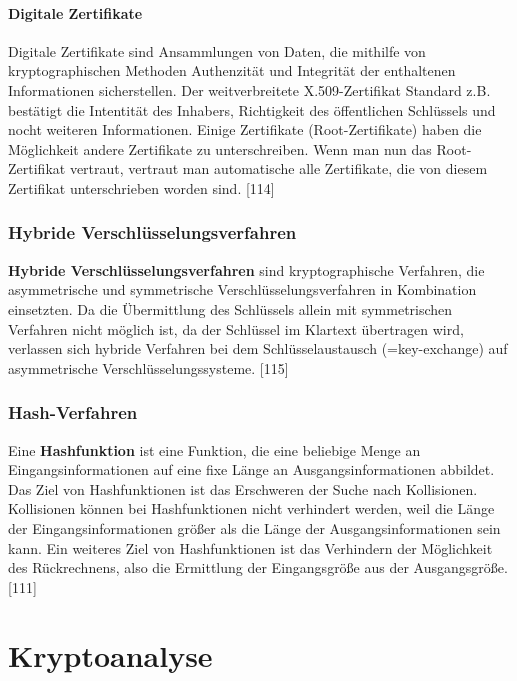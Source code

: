 \documentclass[12pt,a4paper]{report}
\begin{document}
\begin{onehalfspace}
\paragraph{Digitale Zertifikate}

Digitale Zertifikate sind Ansammlungen von Daten, die mithilfe von kryptographischen Methoden Authenzität und Integrität der enthaltenen Informationen sicherstellen. Der weitverbreitete X.509-Zertifikat Standard z.B. bestätigt die Intentität des Inhabers, Richtigkeit des öffentlichen Schlüssels und nocht weiteren Informationen. Einige Zertifikate (Root-Zertifikate) haben die Möglichkeit andere Zertifikate zu unterschreiben. Wenn man nun das Root-Zertifikat vertraut, vertraut man automatische alle Zertifikate, die von diesem Zertifikat unterschrieben worden sind. [114]

\subsubsection{Hybride Verschlüsselungsverfahren}

\textbf{Hybride Verschlüsselungsverfahren} sind kryptographische Verfahren, die asymmetrische und symmetrische Verschlüsselungsverfahren in Kombination einsetzten. Da die Übermittlung des Schlüssels allein mit symmetrischen Verfahren nicht möglich ist, da der Schlüssel im Klartext übertragen wird, verlassen sich hybride Verfahren bei dem Schlüsselaustausch (=key-exchange) auf asymmetrische Verschlüsselungssysteme. [115]

\subsubsection{Hash-Verfahren}

Eine \textbf{Hashfunktion} ist eine Funktion, die eine beliebige Menge an Eingangsinformationen auf eine fixe Länge an Ausgangsinformationen abbildet.  Das Ziel von Hashfunktionen ist das Erschweren der Suche nach Kollisionen. Kollisionen können bei Hashfunktionen nicht verhindert werden, weil die Länge der Eingangsinformationen größer als die Länge der Ausgangsinformationen sein kann. Ein weiteres Ziel von Hashfunktionen ist das Verhindern der Möglichkeit des Rückrechnens, also die Ermittlung der Eingangsgröße aus der Ausgangsgröße.[111]

\newpage
\section{Kryptoanalyse}


\end{onehalfspace}
\end{document}
